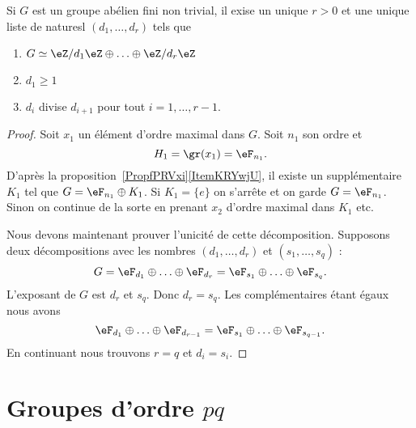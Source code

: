 \begin{theorem} \label{ThoRJWVJd}
    Si \( G\) est un groupe abélien fini non trivial, il exise un unique \( r>0\) et une unique liste de naturesl \( (d_1,\ldots, d_r)\) tels que
    \begin{enumerate}
        \item
		    $G\simeq \eZ/d_1\eZ\oplus\ldots\oplus \eZ/d_r\eZ$
        \item
            \( d_1\geq 1\)
        \item
            \( d_i\) divise \( d_{i+1}\) pour tout \( i=1,\ldots, r-1\).
    \end{enumerate}
\end{theorem}

\begin{proof}
	Soit \( x_1\) un élément d'ordre maximal dans \( G\). Soit \( n_1\) son ordre et
	\begin{equation}
		H_1=\gr(x_1)=\eF_{n_1}.
	\end{equation}
	D'après la proposition~\ref{PropfPRVxi}\ref{ItemKRYwjU}, il existe un supplémentaire \( K_1\) tel que \( G=\eF_{n_1}\oplus K_1\). Si \( K_1=\{ e \}\) on s'arrête et on garde \( G=\eF_{n_1}\). Sinon on continue de la sorte en prenant \( x_2\) d'ordre maximal dans \( K_1\) etc.

    Nous devons maintenant prouver l'unicité de cette décomposition. Supposons deux décompositions avec les nombres \( (d_1,\ldots, d_r)\) et \( (s_1,\ldots, s_q)\) :
	\begin{equation}
		G=\eF_{d_1}\oplus\ldots\oplus \eF_{d_r}=\eF_{s_1}\oplus\ldots\oplus \eF_{s_q}.
	\end{equation}
	L'exposant de \( G\) est \( d_r\) et \( s_q\). Donc \( d_r=s_q\). Les complémentaires étant égaux nous avons
	\begin{equation}
		\eF_{d_1}\oplus\ldots\oplus \eF_{d_{r-1}}=\eF_{s_1}\oplus\ldots\oplus \eF_{s_{q-1}}.
	\end{equation}
	En continuant nous trouvons \( r=q\) et \( d_i=s_i\).
\end{proof}

\section{Groupes d'ordre \texorpdfstring{\(  pq\)}{pq}}

